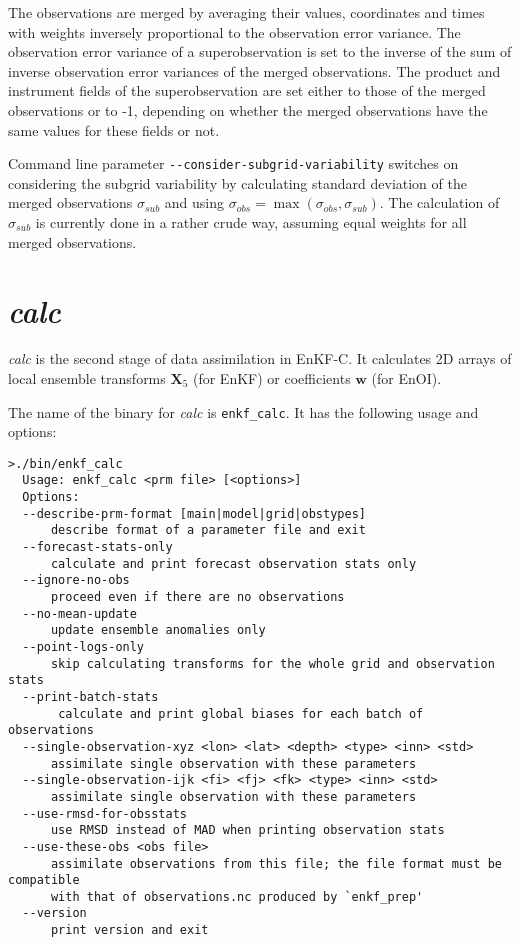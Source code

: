 \documentclass[11pt]{report}
\newcommand{\mb} {\mathbf}
\begin{document}
The observations are merged by averaging their values, coordinates and times with weights inversely proportional to the observation error variance.
The observation error variance of a superobservation is set to the inverse of the sum of inverse observation error variances of the merged observations.
The product and instrument fields of the superobservation are set either to those of the merged observations or to -1, depending on whether the merged observations have the same values for these fields or not.

Command line parameter \verb|--consider-subgrid-variability| switches on considering the subgrid variability by calculating standard deviation of the merged observations $\sigma\!_{sub}$ and using $\sigma\!_{obs} = \max(\sigma\!_{obs}, \sigma\!_{sub})$.
The calculation of $\sigma\!_{sub}$ is currently done in a rather crude way, assuming equal weights for all merged observations.

\section{\emph{calc}}

\emph{calc} is the second stage of data assimilation in EnKF-C.
It calculates 2D arrays of local ensemble transforms $\mb X_5$ (for EnKF) or coefficients $\mb w$ (for EnOI).

The name of the binary for \emph{calc} is \verb|enkf_calc|.
It has the following usage and options:
\begin{Verbatim}[frame=single,fontsize=\footnotesize]
>./bin/enkf_calc 
  Usage: enkf_calc <prm file> [<options>]
  Options:
  --describe-prm-format [main|model|grid|obstypes]
      describe format of a parameter file and exit
  --forecast-stats-only
      calculate and print forecast observation stats only
  --ignore-no-obs
      proceed even if there are no observations
  --no-mean-update
      update ensemble anomalies only
  --point-logs-only
      skip calculating transforms for the whole grid and observation stats
  --print-batch-stats
       calculate and print global biases for each batch of observations
  --single-observation-xyz <lon> <lat> <depth> <type> <inn> <std>
      assimilate single observation with these parameters
  --single-observation-ijk <fi> <fj> <fk> <type> <inn> <std>
      assimilate single observation with these parameters
  --use-rmsd-for-obsstats
      use RMSD instead of MAD when printing observation stats
  --use-these-obs <obs file>
      assimilate observations from this file; the file format must be compatible
      with that of observations.nc produced by `enkf_prep'
  --version
      print version and exit
\end{Verbatim}
\end{document}
